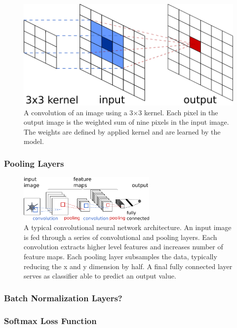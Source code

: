 	\begin{figure}[]
  		\centering
    	\includegraphics[width=\textwidth, keepaspectratio]{img/convolution.pdf}
    	\caption{A convolution of an image using a 3$\times$3 kernel. Each pixel in the output image is the weighted sum of nine pixels in the input image. The weights are defined by applied kernel and are learned by the model.}
    	\label{fig:convolution}
	\end{figure}

\subsubsection{Pooling Layers}

	\begin{figure}[]
  		\centering
    	\includegraphics[width=0.6\textwidth, keepaspectratio]{img/convnet.pdf}
    	\caption{A typical convolutional neural network architecture. An input image is fed through a series of convolutional and pooling layers. Each convolution extracts higher level features and increases number of feature maps. Each pooling layer subsamples the data, typically reducing the x and y dimension by half. A final fully connected layer serves as classifier able to predict an output value.}
    	\label{fig:convnet}
	\end{figure}

\subsubsection{Batch Normalization Layers?}
\subsubsection{Softmax Loss Function}
